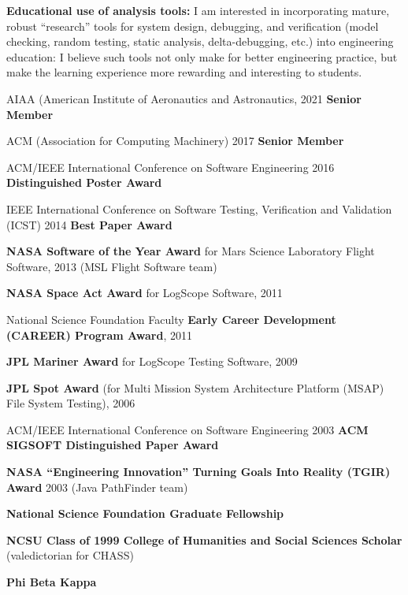 \documentclass[ComputerScience]{vita}
\newcommand{\comment}[1]{}
\begin{document}
\begin{vita}
\begin{Research Interests}
\begin{Topics}
\item{\bf Educational use of analysis tools:}  I am interested in incorporating mature, robust ``research'' tools for system design, debugging, and verification (model checking, random testing, static analysis, delta-debugging, etc.) into engineering education:  I believe such tools not only make for better engineering practice, but make the learning experience more rewarding and interesting to students.
\comment{
\item {\bf Coverage for model checking:} I am interested in coverage metrics and certification methods for model checkers.  Traditional and cutting-edge measures from the world of testing can be applied to model checking runs, and proof-based techniques for certification have recently appeared.  However, the general problem remains:  after verification, how much confidence should we have in in the correctness of a program?}
\end{Topics}
\end{Research Interests}


\begin{Honors}
\item AIAA (American Institute of Aeronautics and Astronautics, 2021 {\bf Senior Member}
\item ACM (Association for Computing Machinery) 2017 {\bf Senior Member}
\item ACM/IEEE International Conference on Software Engineering 2016 {\bf Distinguished Poster Award}
  \item IEEE International Conference on Software Testing, Verification and Validation (ICST) 2014 {\bf Best Paper Award}
  \item {\bf NASA Software of the Year Award} for Mars Science Laboratory Flight Software, 2013 (MSL Flight Software team)
  \item {\bf NASA Space Act Award} for LogScope Software, 2011
  \item National Science Foundation Faculty {\bf Early Career Development (CAREER) Program Award}, 2011
  \item {\bf JPL Mariner Award} for LogScope Testing Software, 2009
  \item {\bf JPL Spot Award} (for Multi Mission System Architecture Platform
  (MSAP) File System Testing), 2006 \item ACM/IEEE International Conference on Software Engineering 2003 {\bf ACM SIGSOFT
  Distinguished Paper Award} \item {\bf NASA ``Engineering Innovation''
  Turning Goals Into Reality (TGIR) Award} 2003 (Java PathFinder team)
  \item {\bf National Science Foundation Graduate Fellowship} \item {\bf NCSU
  Class of 1999 College of Humanities and Social Sciences Scholar}
  (valedictorian for CHASS) \item {\bf Phi Beta Kappa}
\end{Honors}



\end{vita}
\end{document}
